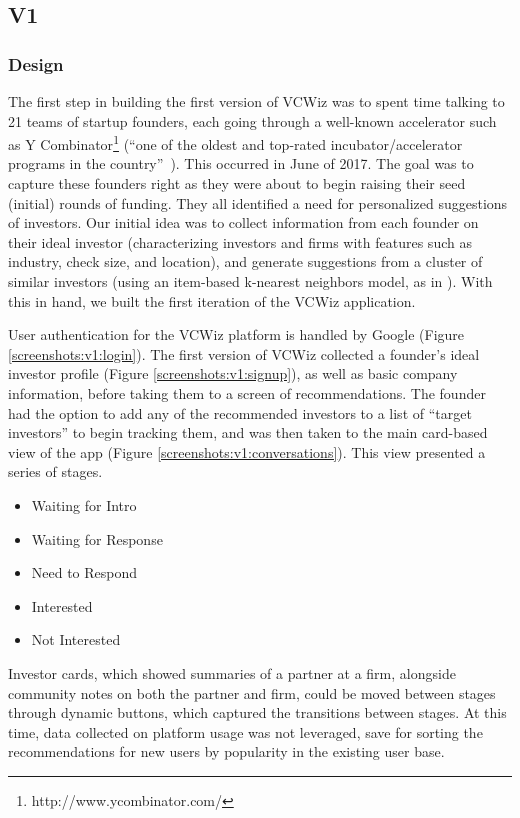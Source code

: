 \subsection{V1}

\subsubsection{Design}

The first step in building the first version of VCWiz was to spent time talking to 21 teams of startup founders, each going through a well-known accelerator such as Y Combinator\footnote{http://www.ycombinator.com/} (``one of the oldest and top-rated incubator/accelerator programs in the country''~\cite{stross2013launch}). This occurred in June of 2017. The goal was to capture these founders right as they were about to begin raising their seed (initial) rounds of funding. They all identified a need for personalized suggestions of investors. Our initial idea was to collect information from each founder on their ideal investor (characterizing investors and firms with features such as industry, check size, and location), and generate suggestions from a cluster of similar investors (using an item-based k-nearest neighbors model, as in \cite{Stone:2013:EST:2541167.2507882}). With this in hand, we built the first iteration of the VCWiz application.

User authentication for the VCWiz platform is handled by Google (Figure \ref{screenshots:v1:login}). The first version of VCWiz collected a founder's ideal investor profile (Figure \ref{screenshots:v1:signup}), as well as basic company information, before taking them to a screen of recommendations. The founder had the option to add any of the recommended investors to a list of ``target investors'' to begin tracking them, and was then taken to the main card-based view of the app (Figure \ref{screenshots:v1:conversations}). This view presented a series of stages.

\begin{itemize}
  \item Waiting for Intro
  \item Waiting for Response
  \item Need to Respond
  \item Interested
  \item Not Interested
\end{itemize}

Investor cards, which showed summaries of a partner at a firm, alongside community notes on both the partner and firm, could be moved between stages through dynamic buttons, which captured the transitions between stages. At this time, data collected on platform usage was not leveraged, save for sorting the recommendations for new users by popularity in the existing user base.

